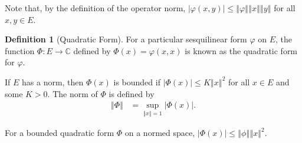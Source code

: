 \documentclass[10pt]{extarticle}
\newcommand{\C}{\mathbb{C}}
\newcommand{\norm}[1]{\left\Vert #1\right\Vert}
\theoremstyle{plain}
\theoremstyle{definition}
\newtheorem*{definition}{Definition}
\theoremstyle{remark}
\renewcommand{\newline}{\hfill\break}
\begin{document}
  Note that, by the definition of the operator norm, $\left\vert \varphi(x,y) \right\vert\leq \norm{\varphi}\norm{x}\norm{y}$ for all $x,y\in E$.
  \begin{definition}[Quadratic Form]
    For a particular sesquilinear form $\varphi$ on $E$, the function $\Phi: E\rightarrow \C$ defined by $\Phi(x) = \varphi(x,x)$ is known as the quadratic form for $\varphi$.\newline

    If $E$ has a norm, then $\Phi(x)$ is bounded if $\left\vert \Phi(x) \right\vert\leq K\norm{x}^2$ for all $x\in E$ and some $K > 0$. The norm of $\Phi$ is defined by
    \begin{align*}
      \norm{\Phi} &= \sup_{\norm{x} = 1}\left\vert \Phi(x) \right\vert.
    \end{align*}
  \end{definition}
  For a bounded quadratic form $\Phi$ on a normed space, $\left\vert \Phi(x) \right\vert\leq \norm{\phi}\norm{x}^2$.\newline
\end{document}
